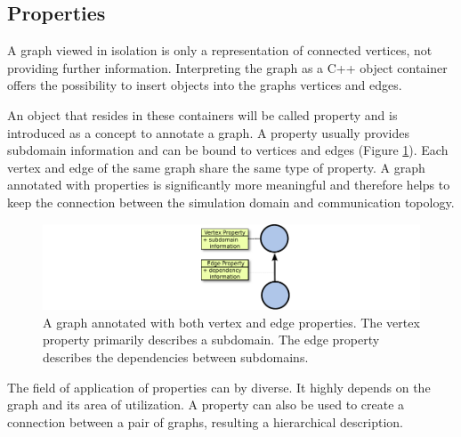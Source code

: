 \subsection{Properties}
A graph viewed in isolation is only a representation of connected
vertices, not providing further information. Interpreting the graph as
a C++ object container offers the possibility to insert objects into the graphs
vertices and edges.

An object that resides in these containers will be called property and
is introduced as a concept to annotate a graph. A property usually
provides subdomain information and can be bound to vertices and edges
(Figure \ref{fig:property}). Each vertex and edge of the same graph
share the same type of property. A graph annotated with
properties is significantly more meaningful and therefore helps to
keep the connection between the simulation domain and communication
topology.

\begin{figure}[H]
  \centering \includegraphics[width=\textwidth]{graphics/30_property}
  \caption{A graph annotated with both vertex and edge properties. The vertex
    property primarily describes a subdomain. The edge property
    describes the dependencies between subdomains.}
  \label{fig:property}
\end{figure}

\noindent The field of application of properties can by diverse. It highly
depends on the graph and its area of utilization.  A property can also
be used to create a connection between a pair of graphs, resulting a
hierarchical description.




